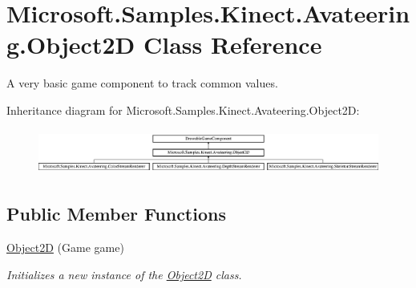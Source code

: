 \hypertarget{class_microsoft_1_1_samples_1_1_kinect_1_1_avateering_1_1_object2_d}{\section{Microsoft.\+Samples.\+Kinect.\+Avateering.\+Object2\+D Class Reference}
\label{class_microsoft_1_1_samples_1_1_kinect_1_1_avateering_1_1_object2_d}
}


A very basic game component to track common values.  


Inheritance diagram for Microsoft.\+Samples.\+Kinect.\+Avateering.\+Object2\+D\+:\begin{figure}[H]
\begin{center}
\leavevmode
\includegraphics[height=1.501340cm]{class_microsoft_1_1_samples_1_1_kinect_1_1_avateering_1_1_object2_d}
\end{center}
\end{figure}
\subsection*{Public Member Functions}
\begin{DoxyCompactItemize}
\item 
\hyperlink{class_microsoft_1_1_samples_1_1_kinect_1_1_avateering_1_1_object2_d_af08680e0c439c7e69d808266fde543ec}{Object2\+D} (Game game)
\begin{DoxyCompactList}\small\item\em Initializes a new instance of the \hyperlink{class_microsoft_1_1_samples_1_1_kinect_1_1_avateering_1_1_object2_d}{Object2\+D} class. \end{DoxyCompactList}\end{DoxyCompactItemize}
